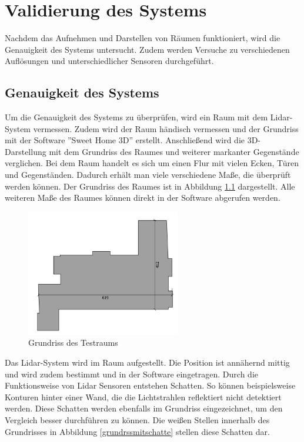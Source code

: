 

\chapter{Validierung des Systems}

Nachdem das Aufnehmen und Darstellen von Räumen funktioniert, wird die Genauigkeit des Systems untersucht. Zudem werden Versuche zu verschiedenen Auflösungen und unterschiedlicher Sensoren durchgeführt.  


\section{Genauigkeit des Systems}

Um die Genauigkeit des Systems zu überprüfen, wird ein Raum mit dem Lidar-System vermessen. Zudem wird der Raum händisch vermessen und der Grundriss mit der Software ''Sweet Home 3D'' erstellt. Anschließend wird die 3D-Darstellung mit dem Grundriss des Raumes und weiterer markanter Gegenstände verglichen.
Bei dem Raum handelt es sich um einen Flur mit vielen Ecken, Türen und Gegenständen. Dadurch erhält man viele verschiedene Maße, die überprüft werden können. Der Grundriss des Raumes ist in Abbildung \ref{grundriss} dargestellt. Alle weiteren Maße des Raumes können direkt in der Software abgerufen werden.

\begin{figure}[H]
	\centering
	\includegraphics[width=0.6\textwidth]{images/Validierung/Grundriss}
	\caption{Grundriss des Testraums}
	\label{grundriss}
\end{figure}


Das Lidar-System wird im Raum aufgestellt. Die Position ist annähernd mittig und wird zudem bestimmt und in der Software eingetragen. Durch die Funktionsweise von Lidar Sensoren entstehen Schatten. So können beispielsweise Konturen hinter einer Wand, die die Lichtstrahlen reflektiert nicht detektiert werden. Diese Schatten werden ebenfalls im Grundriss eingezeichnet, um den Vergleich besser durchführen zu können. Die weißen Stellen innerhalb des Grundrisses in Abbildung \ref{grundrssmitschatte} stellen diese Schatten dar.

